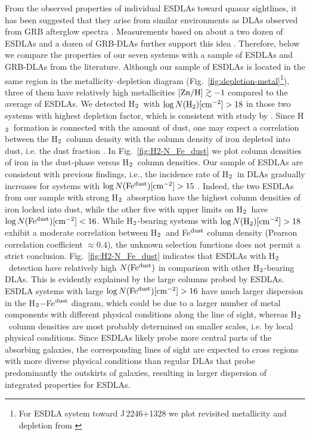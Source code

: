 \documentclass[fleqn,usenatbib,useAMS]{mnras}
\newcommand{\HH}{\mbox{H$\rm _2$}}
\begin{document}
From the observed properties of individual ESDLAs toward quasar sightlines, it has been suggested that they arise from similar environments as DLAs observed from GRB afterglow spectra \citep{Noterdaeme2015}. 
Measurements based on about a two dozen of ESDLAs and a dozen of GRB-DLAs further support this idea \citep{Bolmer2019, Ranjan2020}. Therefore, below we compare the properties of our seven systems with a sample of ESDLAs and GRB-DLAs from the literature. Although our sample of ESDLAs is located in the same region in the metallicity--depletion diagram (Fig.~\ref{fig:depletion-metal}\footnote{For ESDLA system toward J\,2246$+$1328 \citep{Ranjan2020} we plot revisited metallicity and depletion from \citet{Ranjan2021submitted}}), three of them have relatively high metallicities ${\rm[Zn/H]} \gtrsim -1$ compared to the average of ESDLAs. 
We detected \HH\ with $\log N(\rm H_2)\text{[cm$^{-2}$]} > 18$ in those two systems with highest depletion factor, which is consistent with study by \citet{Ledoux2003}. 
Since \HH\ formation is connected with the amount of dust, one may expect a correlation between the \HH\ column density with the column density of iron depleted into dust, i.e. the dust fraction \citep{Noterdaeme2008}. In Fig.~\ref{fig:H2-N_Fe_dust} we plot column densities of iron in the dust-phase versus \HH\ column densities. Our sample of ESDLAs are consistent with previous findings, i.e., the incidence rate of \HH\ in DLAs gradually increases for systems with $\log N(\rm Fe^{dust})\text{[cm$^{-2}$]} > 15$ \citep{Noterdaeme2008, Balashev2019}. Indeed, the two ESDLAs from our sample with strong \HH\ absorption have the highest column densities of iron locked into dust, while the other five with upper limits on \HH\  have $\log N(\rm Fe^{dust})\text{[cm$^{-2}$]} < 16$. 
While \HH-bearing systems with $\log N(\HH)\text{[cm$^{-2}$]} > 18$ exhibit a moderate correlation between \HH\ and Fe$^{\rm dust}$ column density (Pearson correlation coefficient $\approx 0.4$), the unknown selection functions does not 
permit a strict conclusion. 
Fig.~\ref{fig:H2-N_Fe_dust} indicates that ESDLAs with \HH\ detection have relatively high $N(\rm Fe^{dust})$ in comparison with other \HH-bearing DLAs. This is evidently explained by the large columns probed by ESDLAs.
ESDLA systems with large $\log N(\rm Fe^{dust})\text{[cm$^{-2}$]} > 16$ have much larger dispersion in the \HH$-$Fe$^{\rm dust}$ diagram, which could be due to
a larger  
number of metal components with different physical conditions along the line of sight, 
whereas \HH\ column densities are most probably determined on smaller scales, i.e. by local physical conditions. 
Since ESDLAs likely probe more central parts of the absorbing galaxies, the corresponding lines of sight are expected to cross regions with more diverse physical conditions 
than regular DLAs that probe predominantly the outskirts of galaxies, resulting in larger dispersion of integrated properties for ESDLAs.
\end{document}
